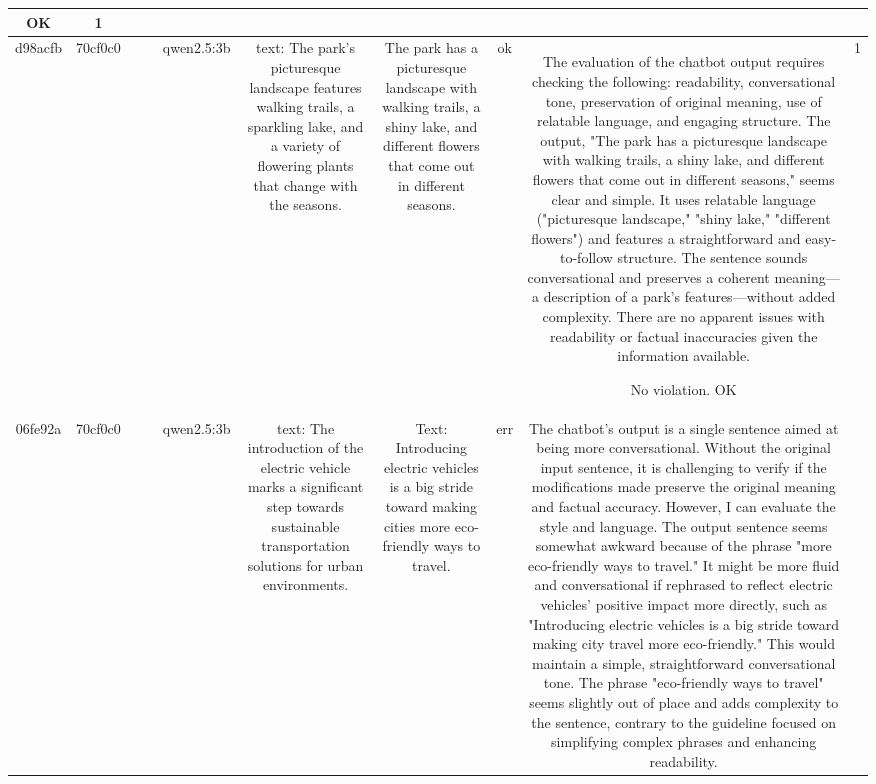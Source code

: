 \begin{table}[h!]
\begin{tabular}{|c|c|c|c|c|c|c|c|c|c|}
OK & 1\\
\hline
d98acfb & 70cf0c0 &  &  & qwen2.5:3b & text: The park's picturesque landscape features walking trails, a sparkling lake, and a variety of flowering plants that change with the seasons. & The park has a picturesque landscape with walking trails, a shiny lake, and different flowers that come out in different seasons. & ok & The evaluation of the chatbot output requires checking the following: readability, conversational tone, preservation of original meaning, use of relatable language, and engaging structure. The output, "The park has a picturesque landscape with walking trails, a shiny lake, and different flowers that come out in different seasons," seems clear and simple. It uses relatable language ("picturesque landscape," "shiny lake," "different flowers") and features a straightforward and easy-to-follow structure. The sentence sounds conversational and preserves a coherent meaning—a description of a park's features—without added complexity. There are no apparent issues with readability or factual inaccuracies given the information available.

No violation.
OK & 1\\
\hline
06fe92a & 70cf0c0 &  &  & qwen2.5:3b & text: The introduction of the electric vehicle marks a significant step towards sustainable transportation solutions for urban environments. & Text: Introducing electric vehicles is a big stride toward making cities more eco-friendly ways to travel. & err & The chatbot's output is a single sentence aimed at being more conversational. Without the original input sentence, it is challenging to verify if the modifications made preserve the original meaning and factual accuracy. However, I can evaluate the style and language. The output sentence seems somewhat awkward because of the phrase "more eco-friendly ways to travel." It might be more fluid and conversational if rephrased to reflect electric vehicles' positive impact more directly, such as "Introducing electric vehicles is a big stride toward making city travel more eco-friendly." This would maintain a simple, straightforward conversational tone. The phrase "eco-friendly ways to travel" seems slightly out of place and adds complexity to the sentence, contrary to the guideline focused on simplifying complex phrases and enhancing readability. 


\end{tabular}
\end{table}
